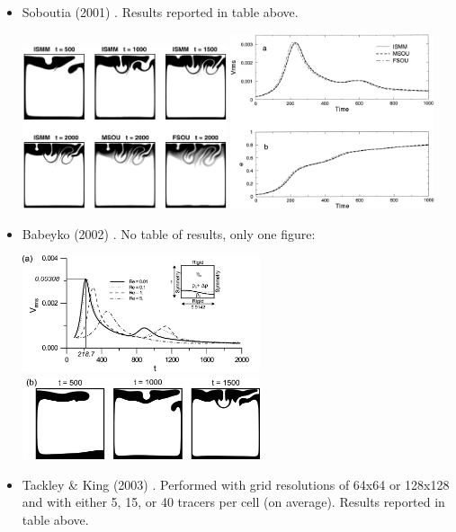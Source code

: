\begin{itemize}
\item Soboutia \etal (2001) \cite{soga01}. Results reported in table above.
\begin{center}
\includegraphics[width=6cm]{images/benchmark_vaks97/soga01a}
\includegraphics[width=6cm]{images/benchmark_vaks97/soga01b}
\end{center}

\item Babeyko \etal (2002) \cite{bast02}. No table of results, only one figure:
\begin{center}
\includegraphics[width=7cm]{images/benchmark_vaks97/bast02_a}
\includegraphics[width=7cm]{images/benchmark_vaks97/bast02_b}
\end{center}

\item Tackley \& King (2003) \cite{taki03}. Performed with grid resolutions of 
64x64 or 128x128 and with either 5, 15, or 40 tracers per cell (on average). 
Results reported in table above. 


\end{itemize}
